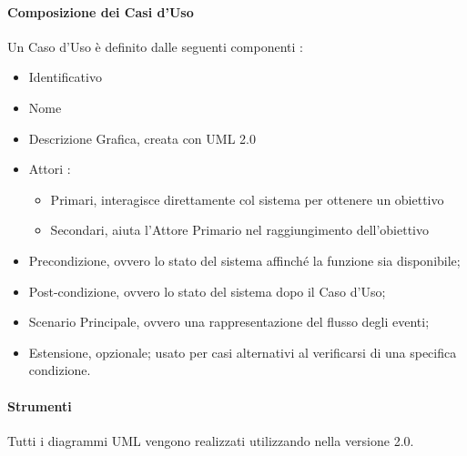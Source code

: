     \paragraph{Composizione dei Casi d'Uso} \hfill \break
    Un Caso d'Uso è definito dalle seguenti componenti : 
    \begin{itemize}
      \item Identificativo
      \item Nome
      \item Descrizione Grafica, creata con UML 2.0
      \item Attori :
      \begin{itemize}
        \item Primari, interagisce direttamente col sistema per ottenere un obiettivo
        \item Secondari, aiuta l'Attore Primario nel raggiungimento dell'obiettivo
      \end{itemize}
        \item Precondizione, ovvero lo stato del sistema affinché la funzione sia disponibile;
        \item Post-condizione, ovvero lo stato del sistema dopo il Caso d'Uso;
        \item Scenario Principale, ovvero una rappresentazione del flusso degli eventi;
        \item Estensione, opzionale; usato per casi alternativi al verificarsi di una specifica condizione.
      \end{itemize}
      
    \paragraph{Strumenti} \hfill \break
    Tutti i diagrammi UML vengono realizzati utilizzando  nella versione 2.0.

